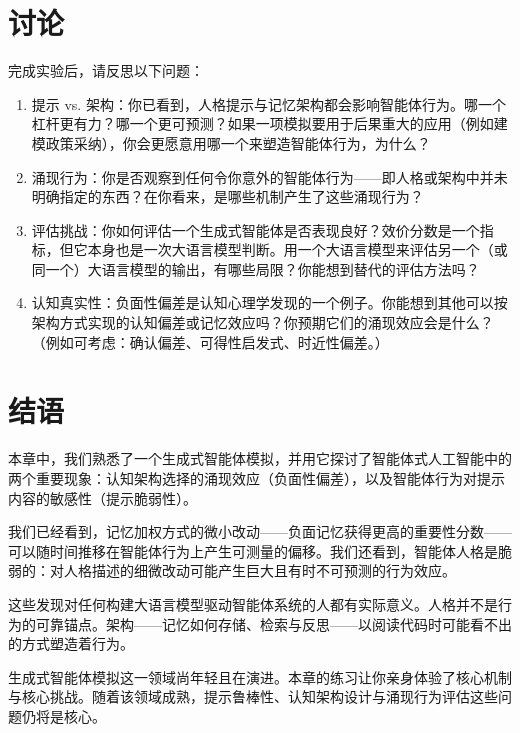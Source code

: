 \section{讨论}

完成实验后，请反思以下问题：

\begin{enumerate}

\item 提示 vs. 架构：你已看到，人格提示与记忆架构都会影响智能体行为。哪一个杠杆更有力？哪一个更可预测？如果一项模拟要用于后果重大的应用（例如建模政策采纳），你会更愿意用哪一个来塑造智能体行为，为什么？

\item 涌现行为：你是否观察到任何令你意外的智能体行为——即人格或架构中并未明确指定的东西？在你看来，是哪些机制产生了这些涌现行为？

\item 评估挑战：你如何评估一个生成式智能体是否表现良好？效价分数是一个指标，但它本身也是一次大语言模型判断。用一个大语言模型来评估另一个（或同一个）大语言模型的输出，有哪些局限？你能想到替代的评估方法吗？

\item 认知真实性：负面性偏差是认知心理学发现的一个例子。你能想到其他可以按架构方式实现的认知偏差或记忆效应吗？你预期它们的涌现效应会是什么？（例如可考虑：确认偏差、可得性启发式、时近性偏差。）

\end{enumerate}

\section{结语}

本章中，我们熟悉了一个生成式智能体模拟，并用它探讨了智能体式人工智能中的两个重要现象：认知架构选择的涌现效应（负面性偏差），以及智能体行为对提示内容的敏感性（提示脆弱性）。

我们已经看到，记忆加权方式的微小改动——负面记忆获得更高的重要性分数——可以随时间推移在智能体行为上产生可测量的偏移。我们还看到，智能体人格是脆弱的：对人格描述的细微改动可能产生巨大且有时不可预测的行为效应。

这些发现对任何构建大语言模型驱动智能体系统的人都有实际意义。人格并不是行为的可靠锚点。架构——记忆如何存储、检索与反思——以阅读代码时可能看不出的方式塑造着行为。

生成式智能体模拟这一领域尚年轻且在演进。本章的练习让你亲身体验了核心机制与核心挑战。随着该领域成熟，提示鲁棒性、认知架构设计与涌现行为评估这些问题仍将是核心。



